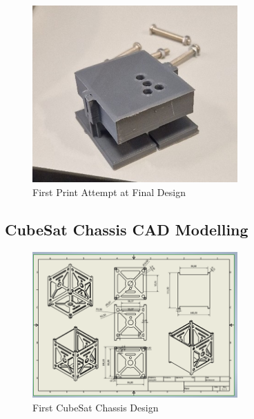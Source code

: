                     \begin{figure}[htbp]
                        \centering
                        \includegraphics[width=0.7\textwidth]{figures/Appendix-CAD/FirstPrintofFinal.jpg}
                        \caption*{First Print Attempt at Final Design} 
                        \label{fig:first-print-final}
                        \end{figure}
                    
                        

    \subsection{CubeSat Chassis CAD Modelling}
    \begin{figure}[htbp]
        \centering
        \includegraphics[width=0.7\textwidth]{figures/Appendix-CAD/CubeDRAW1.png}
        \caption*{First CubeSat Chassis Design} 
        \label{fig:CubeDraw1}
        \end{figure}
    
